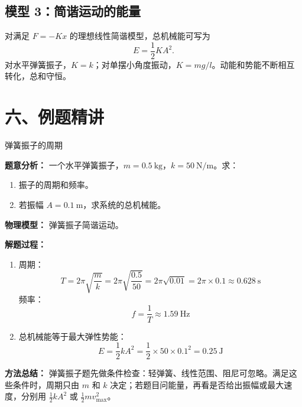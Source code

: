 \begin{center}


\label{fig:pendulum-data-plot}
\end{center}

\subsection*{模型 3：简谐运动的能量}

对满足 $F=-Kx$ 的理想线性简谐模型，总机械能可写为
\[
E=\frac12 KA^2.
\]
对水平弹簧振子，$K=k$；对单摆小角度振动，$K=mg/l$。动能和势能不断相互转化，总和守恒。

\begin{center}


\label{fig:shm-energy}
\end{center}

\section*{六、例题精讲}

\begin{examplebox}{弹簧振子的周期}

\textbf{题意分析：} 一个水平弹簧振子，$m = 0.5\ \mathrm{kg}$，$k = 50\ \mathrm{N/m}$。求：
\begin{enumerate}
  \item 振子的周期和频率。
  \item 若振幅 $A = 0.1\ \mathrm{m}$，求系统的总机械能。
\end{enumerate}

\textbf{物理模型：} 弹簧振子简谐运动。

\textbf{解题过程：}

\begin{enumerate}
  \item 周期：
  \[
  T = 2\pi\sqrt{\frac{m}{k}} = 2\pi\sqrt{\frac{0.5}{50}} = 2\pi\sqrt{0.01} = 2\pi \times 0.1 \approx 0.628\ \mathrm{s}
  \]
  频率：
  \[
  f = \frac{1}{T} \approx 1.59\ \mathrm{Hz}
  \]

  \item 总机械能等于最大弹性势能：
  \[
  E = \frac12 k A^2 = \frac12 \times 50 \times 0.1^2 = 0.25\ \mathrm{J}
  \]
\end{enumerate}

\textbf{方法总结：} 弹簧振子题先做条件检查：轻弹簧、线性范围、阻尼可忽略。满足这些条件时，周期只由 $m$ 和 $k$ 决定；若题目问能量，再看是否给出振幅或最大速度，分别用 $\frac12 kA^2$ 或 $\frac12 mv_{\max}^2$。

\end{examplebox}

